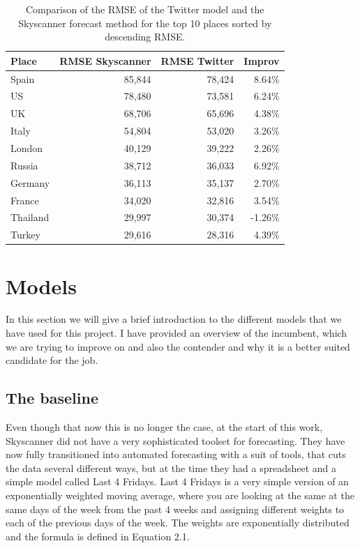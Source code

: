 \documentclass[minf,twoside,singlespacing,parskip,notimes,deptreport]{infthesis} %
\begin{document}
\begin{table}[h!]
\begin{center}
\begin{tabular}{ l | r | r | r }
Place & RMSE Skyscanner & RMSE Twitter  & Improv\\
\hline
Spain & 85,844 & 78,424  & 8.64\%\\
US & 78,480 & 73,581   & 6.24\%\\
UK & 68,706 & 65,696  & 4.38\%\\
Italy & 54,804 & 53,020  & 3.26\% \\
London & 40,129 & 39,222& 2.26\% \\
Russia & 38,712  & 36,033 & 6.92\%\\
Germany & 36,113 & 35,137 & 2.70\% \\
France & 34,020 & 32,816  & 3.54\%\\
Thailand & 29,997 & 30,374 & -1.26\%\\
Turkey & 29,616 & 28,316  & 4.39\%\\
\end{tabular}
\end{center}
\caption{Comparison of the RMSE of the Twitter model and the Skyscanner forecast method for the top 10 places sorted by descending RMSE. }
\label{big-table}
\end{table}

\chapter{Models}

In this section we will give a brief introduction to the different models that we have used for this project. I have provided an overview of the incumbent, which we are trying to improve on and also the contender and why it is a better suited candidate for the job. 



\section{The baseline}

Even though that now this is no longer the case, at the start of this work, Skyscanner did not have a very sophisticated toolset for forecasting. They have now fully transitioned into automated forecasting with a suit of tools, that cuts the data several different ways, but at the time they had a spreadsheet and a simple model called Last 4 Fridays. Last 4 Fridays is a very simple version of an exponentially weighted moving average, where you are looking at the same at the same days of the week from the past 4 weeks and assigning different weights to each of the previous days of the week. The weights are exponentially distributed and the formula is defined in Equation 2.1.
\end{document}
